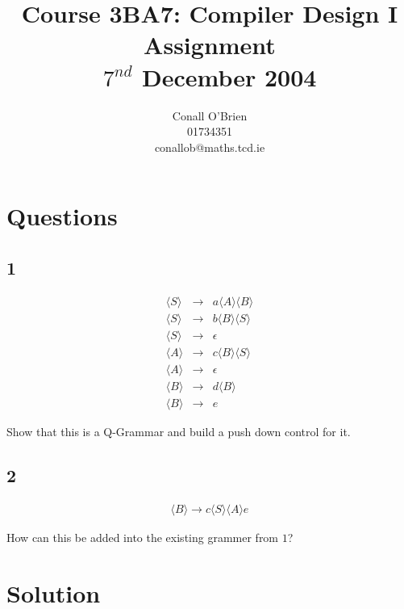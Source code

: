 \documentclass[a4paper,12pt]{article}
\newcommand{\nonterminal}[1]{\langle #1 \rangle}
\begin{document}
\title{Course 3BA7: Compiler Design I \\ Assignment \\ $7^{nd}$ December 2004}

\author{Conall O'Brien \\ 01734351 \\ conallob@maths.tcd.ie}

\maketitle

\section*{Questions}

\subsection*{1}

\begin{eqnarray}
\nonterminal{S}	&	\to	&	a \nonterminal{A} \nonterminal{B}	\\	
\nonterminal{S}	&	\to	&	b \nonterminal{B} \nonterminal{S}	\\	
\nonterminal{S}	&	\to	&	\epsilon										\\	
\nonterminal{A}	&	\to	&	c \nonterminal{B} \nonterminal{S}	\\	
\nonterminal{A}	&	\to	&	\epsilon										\\
\nonterminal{B}	&	\to	&	d \nonterminal{B}							\\	
\nonterminal{B}	&	\to	&	e 													
\end{eqnarray}

Show that this is a Q-Grammar and build a push down control for it.

\subsection*{2}

\begin{eqnarray}
\nonterminal{B} \to c \nonterminal{S} \nonterminal{A} e
\end{eqnarray}

How can this be added into the existing grammer from $1$?

\section*{Solution}
\end{document}
